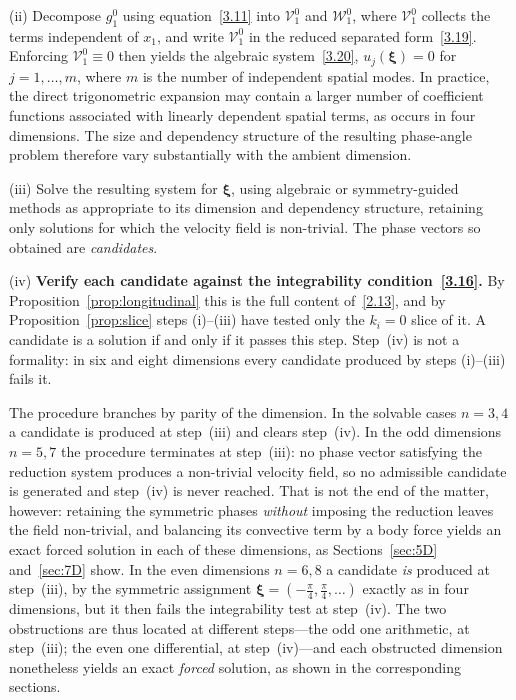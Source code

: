 \documentclass[11pt]{jfm}
\numberwithin{equation}{section}
\begin{document}
\noindent (ii) Decompose $g_1^0$ using equation~\eqref{3.11} into
$\mathcal{V}_1^0$ and $\mathcal{W}_1^0$, where $\mathcal{V}_1^0$ collects the
terms independent of $x_1$, and write $\mathcal{V}_1^0$ in the reduced
separated form~\eqref{3.19}. Enforcing $\mathcal V_1^0\equiv0$ then yields
the algebraic system~\eqref{3.20}, $u_j(\boldsymbol{\xi})=0$ for
$j=1,\dots,m$, where $m$ is the number of independent spatial modes.
In practice, the direct trigonometric expansion may contain a larger number
of coefficient functions associated with linearly dependent spatial terms,
as occurs in four dimensions. The size and dependency structure of the
resulting phase-angle problem therefore vary substantially with the ambient
dimension.

\noindent (iii) Solve the resulting system for $\boldsymbol{\xi}$, using
algebraic or symmetry-guided methods as appropriate to its dimension and
dependency structure, retaining only solutions for which the velocity field
is non-trivial. The phase vectors so obtained are \emph{candidates}.

\noindent (iv) \textbf{Verify each candidate against the integrability
condition~\eqref{3.16}.} By Proposition~\ref{prop:longitudinal} this is the full content
of~\eqref{2.13}, and by Proposition~\ref{prop:slice} steps (i)--(iii) have tested only the
$k_i=0$ slice of it. A candidate is a solution if and only if it passes this step. Step~(iv)
is not a formality: in six and eight dimensions every candidate produced by steps
(i)--(iii) fails it.

The procedure branches by parity of the dimension. In the solvable cases $n=3,4$ a
candidate is produced at step~(iii) and clears step~(iv). In the odd dimensions $n=5,7$
the procedure terminates at step~(iii): no phase vector satisfying the reduction system produces a
non-trivial velocity field, so no admissible candidate is generated and step~(iv) is never
reached. That is not the end of the matter, however: retaining the symmetric phases
\emph{without} imposing the reduction leaves the field non-trivial, and balancing its convective
term by a body force yields an exact forced solution in each of these dimensions, as
Sections~\ref{sec:5D} and~\ref{sec:7D} show. In the even dimensions $n=6,8$ a candidate
\emph{is} produced at step~(iii), by the symmetric assignment
$\boldsymbol{\xi}=(-\tfrac{\pi}{4},\tfrac{\pi}{4},\dots)$ exactly as in four dimensions, but
it then fails the integrability test at step~(iv). The two obstructions are thus located at
different steps---the odd one arithmetic, at step~(iii); the even one differential, at
step~(iv)---and each obstructed dimension nonetheless yields an exact \emph{forced} solution,
as shown in the corresponding sections.
\end{document}

